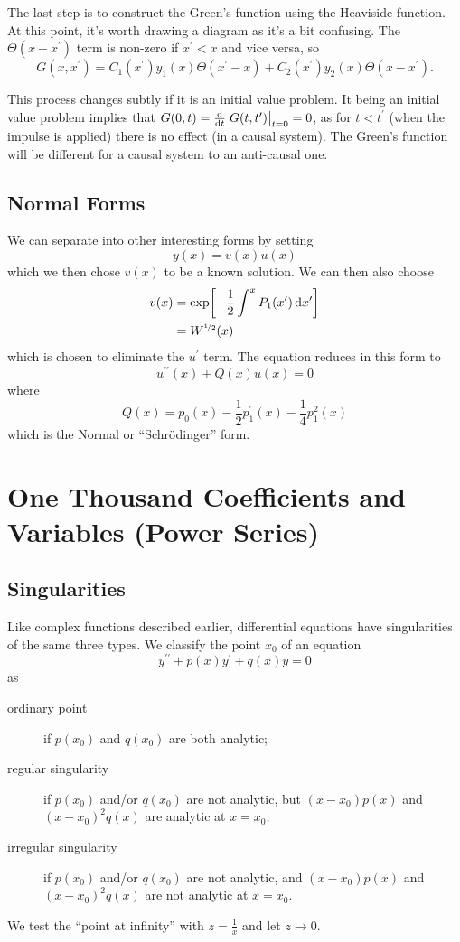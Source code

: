 \documentclass[a4paper,12pt,parskip=full,BCOR=1cm]{scrreprt}
\begin{document}
The last step is to construct the Green's function using the Heaviside function.
At this point, it's worth drawing a diagram as it's a bit confusing.
The $\Theta(x-x^\prime)$ term is non-zero if $x^\prime<x$ and vice versa, so
\begin{equation*}
 G(x,x^\prime) = C_1(x^\prime)y_1(x)\Theta(x^\prime - x) + C_2(x^\prime)y_2(x)\Theta(x - x^\prime).
\end{equation*}

This process changes subtly if it is an initial value problem.
It being an initial value problem implies that $G(0,t)=\dv{t}\eval{G(t, t^\prime)}_{t=0}=0$, as for $t<t^\prime$ (when the impulse is applied) there is no effect (in a causal system).
The Green's function will be different for a causal system to an anti-causal one.

\section{Normal Forms}
We can separate into other interesting forms by setting $$y(x)=v(x)u(x)$$ which we then chose $v(x)$ to be a known solution.
We can then also choose
\begin{align*}
 v(x) & = \exp[-\frac{1}{2}\int^x P_1(x^\prime) \dd{x^\prime}] \\
      & = W^{\nicefrac{1}{2}}(x)
\end{align*}
which is chosen to eliminate the $u^\prime$ term.
The equation reduces in this form to
$$u^{\prime\prime}(x) + Q(x)u(x) = 0$$ where $$Q(x) = p_0(x) - \frac{1}{2}p_1^\prime(x) - \frac{1}{4}p_1^2(x)$$
which is the Normal or ``Schr\"odinger'' form.

\chapter{One Thousand Coefficients and Variables (Power Series)}
\section{Singularities}
Like complex functions described earlier, differential equations have singularities of the same three types.
We classify the point $x_0$ of an equation
$$y^{\prime\prime} + p(x)y^\prime + q(x)y = 0$$
as
\begin{description}
 \item [ordinary point] if $p(x_0)$ and $q(x_0)$ are both analytic;
 \item [regular singularity] if $p(x_0)$ and/or $q(x_0)$ are not analytic, but $(x-x_0)p(x)$ and $(x-x_0)^2q(x)$ are analytic at $x=x_0$;
 \item [irregular singularity] if $p(x_0)$ and/or $q(x_0)$ are not analytic, and $(x-x_0)p(x)$ and $(x-x_0)^2q(x)$ are not analytic at $x=x_0$.
\end{description}
We test the ``point at infinity'' with $z=\frac{1}{x}$ and let $z\rightarrow 0$.
\end{document}
